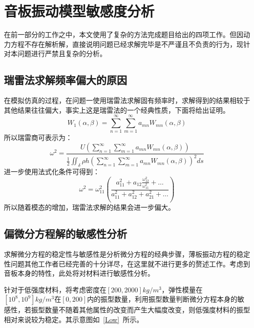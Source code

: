 \documentclass[withoutpreface,bwprint]{cumcmthesis} %
\begin{document}
\section{音板振动模型敏感度分析}
在前一部分的工作之中，本文使用了复杂的方法完成题目给出的四项工作。但因动力方程不存在解析解，直接说明问题已经求解完毕是不严谨且不负责的行为，现针对本问题进行严禁且复杂的分析。
\subsection{瑞雷法求解频率偏大的原因}
在模拟仿真的过程，在问题一使用瑞雷法求解固有频率时，求解得到的结果相较于其他结果往往偏大，事实上这是瑞雷法的一个经典性质，下面将给出证明。
\begin{equation}
    W_1(\alpha,\beta)=\sum_{n=1}^\infty \sum_{m=1}^\infty a_{mn}W_{mn}(\alpha,\beta)
\end{equation}
所以瑞雷商可表示为：
\begin{equation}
   \omega^2=\frac{U\left(\sum_{n=1}^\infty \sum_{m=1}^\infty a_{mn}W_{mn}\left(\alpha,\beta\right)\right)}{\tfrac{1}{2}\iint_\delta \rho h \left(\sum_{n=1}^\infty \sum_{m=1}^\infty a_{mn}W_{mn}\left(\alpha,\beta\right)\right)^2 d s}
\end{equation}
进一步使用法式化条件可得到：
\begin{equation}
    \omega^2=\omega_{11}^2\left(\frac{a_{11}^2+a_{12}\frac{\omega_{12}^2}{\omega_{11}^2}+\dots}{a_{11}^2+a_{12}^2+a_{21}^2+\dots}\right)
\end{equation}
所以随着模态的增加，瑞雷法求解的结果会进一步偏大。
\subsection{偏微分方程解的敏感性分析}
求解微分方程的稳定性与敏感性是分析微分方程的经典步骤，薄板振动方程的稳定性问题其他工作者已经完善的十分详尽\cite{ref5}，在这里就不进行更多的赘述工作。考虑到音板本身的特性，此处将对材料进行敏感性分析。

针对于低强度材料，将考虑密度在$\left[200,2000\right]kg/m^3$，弹性模量在$\left[10^8,10^9\right]kg/m^3$在$\left[0,200\right]$内的振型数量，利用振型数量判断微分方程本身的敏感性，若振型数量不随着其他属性的改变而产生大幅度改变，则低强度材料的振型相对来说较为稳定。其示意图如~\ref{Low}~所示。
\end{document}

